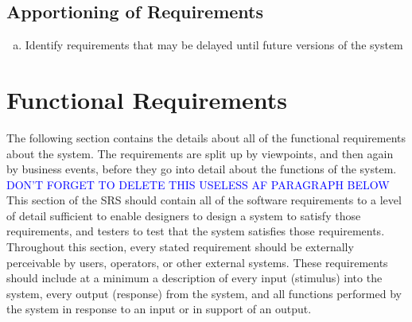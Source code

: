 \documentclass[]{article}
\begin{document}
\subsection{Apportioning of Requirements}
\label{sub:apportioning_of_requirements}
\begin{enumerate}[a)]
	\item Identify requirements that may be delayed until future versions of the system
\end{enumerate}


\section{Functional Requirements}
\label{sec:functional_requirements}
The following section contains the details about all of the functional requirements about the system. The requirements are split up by viewpoints, and then again by business events, before they go into detail about the functions of the system.\\ 

\textcolor{blue}{DON'T FORGET TO DELETE THIS USELESS AF PARAGRAPH BELOW}\\

This section of the SRS should contain all of the software requirements to a level of detail sufficient to enable designers to design a system to satisfy those requirements, and testers to test that the system satisfies those requirements. Throughout this section, every stated requirement should be externally perceivable by users, operators, or other external systems. These requirements should include at a minimum a description of every input (stimulus) into the system, every output (response) from the system, and all functions performed by the system in response to an input or in support of an output.
\end{document}
